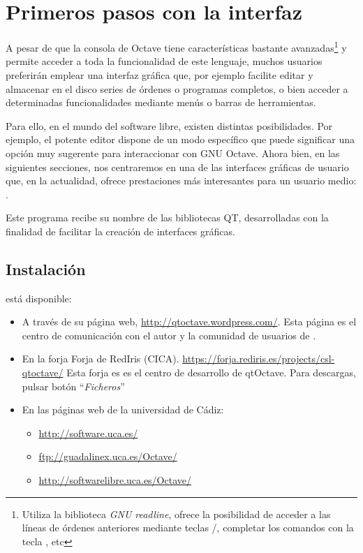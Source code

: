 
\section{Primeros pasos con la interfaz \qtoctave}
\label{sec:qtoctave}

A pesar de que la consola de Octave tiene características bastante
avanzadas\footnote{Utiliza la biblioteca \emph{GNU readline}, ofrece
  la posibilidad de acceder a las líneas de órdenes anteriores
  mediante teclas /,
  completar los comandos con la tecla , etc} y
permite acceder a toda la funcionalidad de este lenguaje, muchos
usuarios preferirán emplear una interfaz gráfica que, por ejemplo
facilite editar y almacenar en el disco series de órdenes o programas
completos, o bien acceder a determinadas funcionalidades mediante
menús o barras de herramientas.

Para ello, en el mundo del software libre, existen distintas
posibilidades. Por ejemplo, el potente editor \emacs dispone de un
modo específico que puede significar una opción muy sugerente para
interaccionar con GNU Octave. Ahora bien, en las siguientes secciones,
nos centraremos en una de las interfaces gráficas de usuario que, en la
actualidad, ofrece prestaciones más interesantes para un usuario medio:
\qtoctave.

Este programa recibe su nombre de las bibliotecas QT, desarrolladas
con la finalidad de facilitar la creación de interfaces gráficas.
 
\subsection*{Instalación}

\qtoctave está disponible:
\begin{itemize}
\item A través de su página web, \url{http://qtoctave.wordpress.com/}.
  Esta página es el centro de
  comunicación con el autor y la comunidad de usuarios de \qtoctave.
\item En la forja Forja de RedIris
  (CICA). \url{https://forja.rediris.es/projects/csl-qtoctave/} Esta
  forja es es el centro de desarrollo de
  qtOctave. Para descargas, pulsar botón ``\textit{Ficheros}''
\item En las páginas web de la universidad de Cádiz:
  \begin{itemize}
  \item \url{http://software.uca.es/}
  \item \url{ftp://guadalinex.uca.es/Octave/}
  \item \url{http://softwarelibre.uca.es/Octave/}
  \end{itemize}
\end{itemize}

